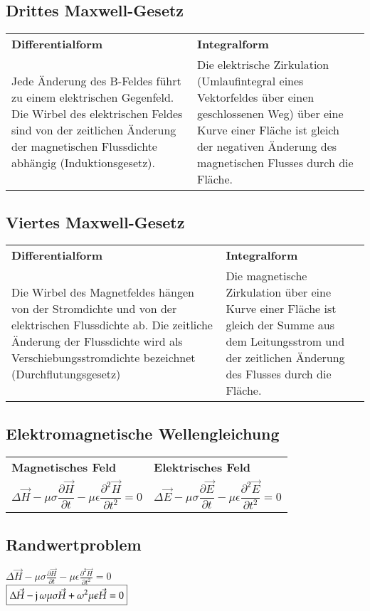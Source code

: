 \subsection{Drittes Maxwell-Gesetz}
\begin{tabular}{p{} p{}}
	\textbf{Differentialform}&\textbf{Integralform}\\
	Jede Änderung des B-Feldes führt zu einem elektrischen Gegenfeld. Die Wirbel des elektrischen Feldes sind von der zeitlichen Änderung der magnetischen Flussdichte abhängig (Induktionsgesetz). & Die elektrische Zirkulation (Umlaufintegral eines Vektorfeldes über  einen geschlossenen Weg) über eine Kurve einer Fläche ist gleich der negativen Änderung des magnetischen Flusses durch die Fläche.\\
\end{tabular}
\subsection{Viertes Maxwell-Gesetz}
\begin{tabular}{p{} p{}}
	\textbf{Differentialform}&\textbf{Integralform}\\
	Die Wirbel des Magnetfeldes hängen von der Stromdichte und von der elektrischen Flussdichte ab. Die zeitliche Änderung der Flussdichte wird als Verschiebungsstromdichte bezeichnet (Durchflutungsgesetz)& Die magnetische Zirkulation über eine Kurve einer Fläche ist gleich der Summe aus dem Leitungsstrom und der zeitlichen Änderung des Flusses durch die Fläche. \\
\end{tabular}
\subsection{Elektromagnetische Wellengleichung}
\begin{tabular}{p{} p{}}
	{\hspace{-2.5cm}\centering\textbf{Magnetisches Feld}\par}&{\hspace{-2.5cm}\centering\textbf{Elektrisches Feld}\par}\\[-1.5cm]
	\[\Delta\vec{H}-\mu\sigma\frac{\partial \vec{H}}{\partial t}-\mu\epsilon\frac{\partial^{2}\vec{H}}{\partial t^{2}}=0\]&	\[\Delta\vec{E}-\mu\sigma\frac{\partial \vec{E}}{\partial t}-\mu\epsilon\frac{\partial^{2}\vec{E}}{\partial t^{2}}=0\]  \\
\end{tabular}

\subsection{Randwertproblem}
$\boxed{\Delta\vec{H}-\mu\sigma\frac{\partial \vec{H}}{\partial t}-\mu\epsilon\frac{\partial^{2}\vec{H}}{\partial t^{2}}=0}$\\
$\boxed{\Delta \vec{H}-\imaginär\omega\mu\sigma\vec{H}+\omega^{2}\mu\epsilon\vec{H}=0}$
\clearpage
\pagebreak